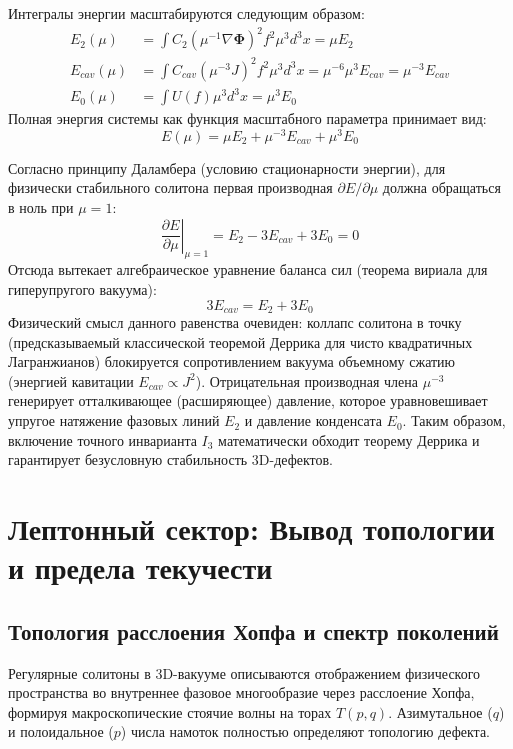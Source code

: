 \documentclass[12pt,a4paper]{article}
\begin{document}
Интегралы энергии масштабируются следующим образом:
\begin{align}
	E_2(\mu) &= \int C_2 (\mu^{-1} \nabla \boldsymbol{\Phi})^2 f^2 \mu^3 d^3x = \mu E_2 \\
	E_{cav}(\mu) &= \int C_{cav} (\mu^{-3} J)^2 f^2 \mu^3 d^3x = \mu^{-6} \mu^3 E_{cav} = \mu^{-3} E_{cav} \\
	E_0(\mu) &= \int U(f) \mu^3 d^3x = \mu^3 E_0
\end{align}
Полная энергия системы как функция масштабного параметра принимает вид: 
\begin{equation}
	E(\mu) = \mu E_2 + \mu^{-3} E_{cav} + \mu^3 E_0
\end{equation}

Согласно принципу Даламбера (условию стационарности энергии), для физически стабильного солитона первая производная $\partial E / \partial \mu$ должна обращаться в ноль при $\mu = 1$:
\begin{equation}
	\left. \frac{\partial E}{\partial \mu} \right|_{\mu=1} = E_2 - 3 E_{cav} + 3 E_0 = 0
\end{equation}
Отсюда вытекает алгебраическое уравнение баланса сил (теорема вириала для гиперупругого вакуума):
\begin{equation}
	3 E_{cav} = E_2 + 3 E_0
\end{equation}
Физический смысл данного равенства очевиден: коллапс солитона в точку (предсказываемый классической теоремой Деррика для чисто квадратичных Лагранжианов) блокируется сопротивлением вакуума объемному сжатию (энергией кавитации $E_{cav} \propto J^2$). Отрицательная производная члена $\mu^{-3}$ генерирует отталкивающее (расширяющее) давление, которое уравновешивает упругое натяжение фазовых линий $E_2$ и давление конденсата $E_0$. 
Таким образом, включение точного инварианта $I_3$ математически обходит теорему Деррика и гарантирует безусловную стабильность 3D-дефектов.
	
	\section{Лептонный сектор: Вывод топологии и предела текучести}
	
	\subsection{Топология расслоения Хопфа и спектр поколений}
	Регулярные солитоны в 3D-вакууме описываются отображением физического пространства во внутреннее фазовое многообразие через расслоение Хопфа, формируя макроскопические стоячие волны на торах $T(p,q)$. Азимутальное ($q$) и полоидальное ($p$) числа намоток полностью определяют топологию дефекта.
	
\end{document}
